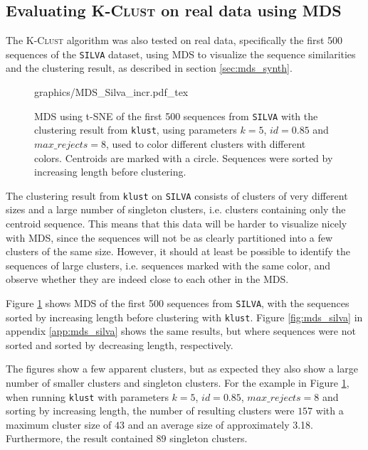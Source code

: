 \subsection{Evaluating \textsc{K-Clust} on real data using MDS}
\label{sec:mds_real_data}

The \textsc{K-Clust} algorithm was also tested on real data, specifically the
first 500 sequences of the \texttt{SILVA} dataset, using MDS to visualize the
sequence similarities and the clustering result, as described in section
\ref{sec:mds_synth}.

\begin{figure}[H]
  \centering
  \def\svgwidth{\columnwidth}
  {graphics/MDS_Silva_incr.pdf_tex}
  \caption{MDS using t-SNE of the first 500 sequences from \texttt{SILVA} with
    the clustering result from \texttt{klust}, using parameters $k=5$,
    $id=0.85$ and $max\_rejects=8$, used to color different clusters with
    different colors. Centroids are marked with a circle. Sequences were sorted
    by increasing length before clustering.}
  \label{fig:mds_silva_sort_incr}
\end{figure}

The clustering result from \texttt{klust} on \texttt{SILVA} consists of
clusters of very different sizes and a large number of singleton clusters, i.e.
clusters containing only the centroid sequence. This means that this data will
be harder to visualize nicely with MDS, since the sequences will not be as
clearly partitioned into a few clusters of the same size. However, it should at
least be possible to identify the sequences of large clusters, i.e. sequences
marked with the same color, and observe whether they are indeed close to each
other in the MDS.

Figure \ref{fig:mds_silva_sort_incr} shows MDS of the first 500 sequences from
\texttt{SILVA}, with the sequences sorted by increasing length before
clustering with \texttt{klust}. Figure \ref{fig:mds_silva} in appendix
\ref{app:mds_silva} shows the same results, but where sequences were not sorted
and sorted by decreasing length, respectively.

The figures show a few apparent clusters, but as expected they also show a
large number of smaller clusters and singleton clusters. For the example in
Figure \ref{fig:mds_silva_sort_incr}, when running \texttt{klust} with
parameters $k=5$, $id=0.85$, $max\_rejects=8$ and sorting by increasing length,
the number of resulting clusters were $157$ with a maximum cluster size of $43$
and an average size of approximately \num{3.18}. Furthermore, the result
contained $89$ singleton clusters.

